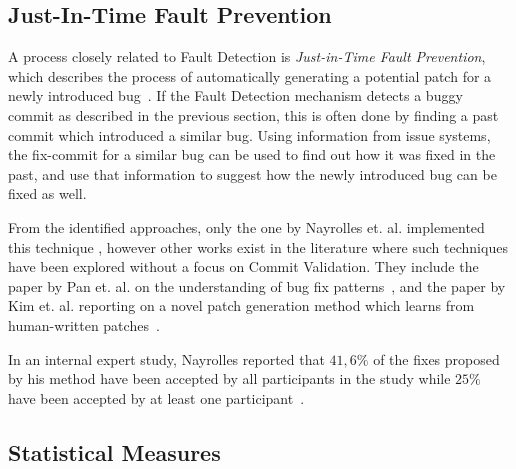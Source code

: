\subsection{Just-In-Time Fault Prevention}
\label{sec:faultprevention}

A process closely related to Fault Detection is \textit{Just-in-Time Fault Prevention}, which describes the process of automatically generating a potential patch for a newly introduced bug~\cite{Nayrolles2018}. If the Fault Detection mechanism detects a buggy commit as described in the previous section, this is often done by finding a past commit which introduced a similar bug. Using information from issue systems, the fix-commit for a similar bug can be used to find out how it was fixed in the past, and use that information to suggest how the newly introduced bug can be fixed as well.

From the identified approaches, only the one by Nayrolles et. al. implemented this technique \cite{Nayrolles2018}, 
however other works exist
in the literature where such techniques have been explored without a focus on Commit Validation. %
They include the paper by Pan et. al. on the understanding of bug fix patterns~\cite{Pan2009}, and the paper by Kim et. al. reporting on a novel patch generation method which learns from human-written patches~\cite{Kim2013}.

In an internal expert study, Nayrolles reported that $41,6\%$ of the fixes proposed by his method have been accepted by all participants in the study while $25\%$ have been accepted by at least one participant~\cite{Nayrolles2018}.

\subsection{Statistical Measures}
\label{sec:statisticalmeasures}

